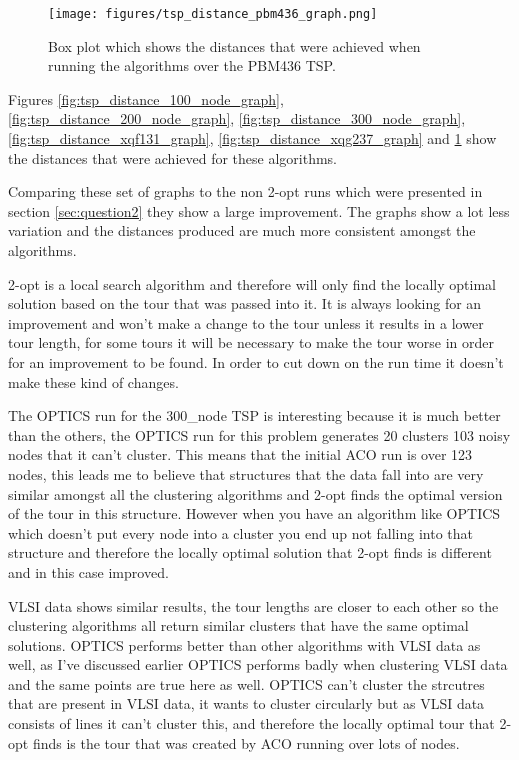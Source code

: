 \begin{figure}
    \centering
    \texttt{[image: figures/tsp\_distance\_pbm436\_graph.png]}
    \caption{Box plot which shows the distances that were achieved when running the algorithms over the PBM436 TSP.}
    \label{fig:tsp_distance_pbm436_graph}
\end{figure}

Figures \ref{fig:tsp_distance_100_node_graph},  \ref{fig:tsp_distance_200_node_graph},  \ref{fig:tsp_distance_300_node_graph},  \ref{fig:tsp_distance_xqf131_graph},  \ref{fig:tsp_distance_xqg237_graph} and  \ref{fig:tsp_distance_pbm436_graph} show the distances that were achieved for these algorithms.

Comparing these set of graphs to the non 2-opt runs which were presented in section \ref{sec:question2} they show a large improvement. The graphs show a lot less variation and the distances produced are much more consistent amongst the algorithms. 

2-opt is a local search algorithm and therefore will only find the locally optimal solution based on the tour that was passed into it. It is always looking for an improvement and won't make a change to the tour unless it results in a lower tour length, for some tours it will be necessary to make the tour worse in order for an improvement to be found. In order to cut down on the run time it doesn't make these kind of changes. 

The OPTICS run for the 300\_node TSP is interesting because it is much better than the others, the OPTICS run for this problem generates 20 clusters 103 noisy nodes that it can't cluster. This means that the initial ACO run is over 123 nodes, this leads me to believe that structures that the data fall into are very similar amongst all the clustering algorithms and 2-opt finds the optimal version of the tour in this structure. However when you have an algorithm like OPTICS which doesn't put every node into a cluster you end up not falling into that structure and therefore the locally optimal solution that 2-opt finds is different and in this case improved.

VLSI data shows similar results, the tour lengths are closer to each other so the clustering algorithms all return similar clusters that have the same optimal solutions. OPTICS performs better than other algorithms with VLSI data as well, as I've discussed earlier OPTICS performs badly when clustering VLSI data and the same points are true here as well. OPTICS can't cluster the strcutres that are present in VLSI data, it wants to cluster circularly but as VLSI data consists of lines it can't cluster this, and therefore the locally optimal tour that 2-opt finds is the tour that was created by ACO running over lots of nodes.

